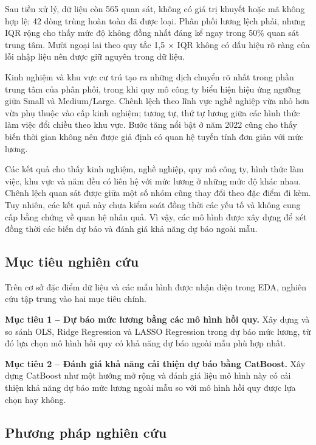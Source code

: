 Sau tiền xử lý, dữ liệu còn 565 quan sát, không có giá trị khuyết hoặc
mã không hợp lệ; 42 dòng trùng hoàn toàn đã được loại. Phân phối lương
lệch phải, nhưng IQR rộng cho thấy mức độ không đồng nhất đáng kể ngay
trong 50\% quan sát trung tâm. Mười ngoại lai theo quy tắc 1,5 \(\times\) IQR
không có dấu hiệu rõ ràng của lỗi nhập liệu nên được giữ nguyên trong dữ
liệu.

Kinh nghiệm và khu vực cư trú tạo ra những dịch chuyển rõ nhất trong
phần trung tâm của phân phối, trong khi quy mô công ty biểu hiện hiệu
ứng ngưỡng giữa Small và Medium/Large. Chênh lệch theo lĩnh vực nghề
nghiệp vừa nhỏ hơn vừa phụ thuộc vào cấp kinh nghiệm; tương tự, thứ tự
lương giữa các hình thức làm việc đổi chiều theo khu vực. Bước tăng nổi
bật ở năm 2022 cũng cho thấy biến thời gian không nên được giả định có
quan hệ tuyến tính đơn giản với mức lương.

Các kết quả cho thấy kinh nghiệm, nghề nghiệp, quy mô công ty, hình thức
làm việc, khu vực và năm đều có liên hệ với mức lương ở những mức độ
khác nhau. Chênh lệch quan sát được giữa một số nhóm cũng thay đổi theo
đặc điểm đi kèm. Tuy nhiên, các kết quả này chưa kiểm soát đồng thời các
yếu tố và không cung cấp bằng chứng về quan hệ nhân quả. Vì vậy, các mô
hình được xây dựng để xét đồng thời các biến dự báo và đánh giá khả năng
dự báo ngoài mẫu.

\subsection{Mục tiêu nghiên
cứu}\label{nghi:mux1ee5c-tiuxeau-nghiuxean-cux1ee9u}

Trên cơ sở đặc điểm dữ liệu và các mẫu hình được nhận diện trong EDA,
nghiên cứu tập trung vào hai mục tiêu chính.

\textbf{Mục tiêu 1 -- Dự báo mức lương bằng các mô hình hồi quy.} Xây
dựng và so sánh OLS, Ridge Regression và LASSO Regression trong dự báo
mức lương, từ đó lựa chọn mô hình hồi quy có khả năng dự báo ngoài mẫu
phù hợp nhất.

\textbf{Mục tiêu 2 -- Đánh giá khả năng cải thiện dự báo bằng CatBoost.}
Xây dựng CatBoost như một hướng mở rộng và đánh giá liệu mô hình này có
cải thiện khả năng dự báo mức lương ngoài mẫu so với mô hình hồi quy
được lựa chọn hay không.

\subsection{Phương pháp nghiên
cứu}\label{nghi:phux1b0ux1a1ng-phuxe1p-nghiuxean-cux1ee9u}

